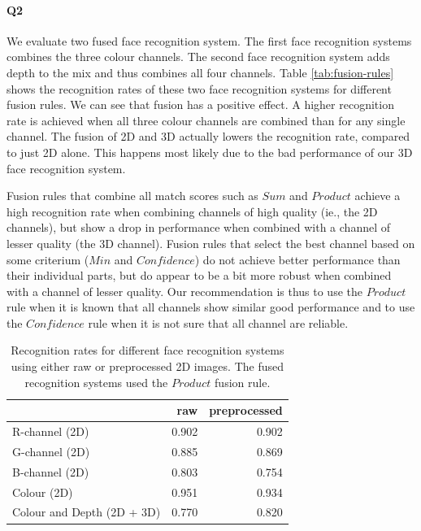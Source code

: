 \documentclass[]{article}
\begin{document}
\paragraph{Q2} We evaluate two fused face recognition system. The first face recognition systems combines the three colour channels. The second face recognition system adds depth to the mix and thus combines all four channels. Table \ref{tab:fusion-rules} shows the recognition rates of these two face recognition systems for different fusion rules. We can see that fusion has a positive effect. A higher recognition rate is achieved when all three colour channels are combined than for any single channel. The fusion of 2D and 3D actually lowers the recognition rate, compared to just 2D alone. This happens most likely due to the bad performance of our 3D face recognition system.

Fusion rules that combine all match scores such as $Sum$ and $Product$ achieve a high recognition rate when combining channels of high quality (ie., the 2D channels), but show a drop in performance when combined with a channel of lesser quality (the 3D channel). Fusion rules that select the best channel based on some criterium ($Min$ and $Confidence$) do not achieve better performance than their individual parts, but do appear to be a bit more robust when combined with a channel of lesser quality. Our recommendation is thus to use the $Product$ rule when it is known that all channels show similar good performance and to use the $Confidence$ rule when it is not sure that all channel are reliable.

\begin{table}
	\centering
	\begin{tabular}{lrr}
		\toprule
			& raw & preprocessed\\
		\midrule
		R-channel (2D) & 0.902& 0.902\\
		G-channel (2D) & 0.885& 0.869 \\
		B-channel (2D) & 0.803& 0.754  \\
		Colour (2D) & 0.951& 0.934\\
		Colour and Depth (2D + 3D) & 0.770 & 0.820\\
		\bottomrule
	\end{tabular}
	\caption{Recognition rates for different face recognition systems using either raw or preprocessed 2D images. The fused recognition systems used the $Product$ fusion rule.}
	\label{tab:preprocess-rr}
\end{table}
\end{document}
